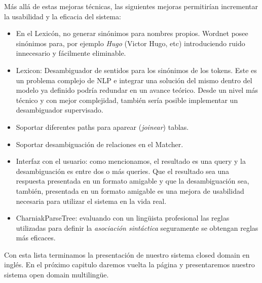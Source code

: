 Más allá de estas mejoras técnicas, las siguientes mejoras permitirían incrementar la usabilidad y la eficacia del sistema:

\begin{itemize}
\item En el Lexicón, no generar sinónimos para nombres propios. Wordnet posee sinónimos para, por ejemplo \textit{Hugo} (Victor Hugo, etc) introduciendo ruido innecesario y fácilmente eliminable.
\item Lexicon: Desambiguador de sentidos para los sinónimos de los tokens. Este es un problema complejo de NLP e integrar una solución del mismo dentro del modelo ya definido podría redundar en un avance teórico. Desde un nivel más técnico y con mejor complejidad, también sería posible implementar un desambiguador supervisado.
\item Soportar diferentes paths para aparear (\textit{joinear}) tablas.
\item Soportar desambiguación de relaciones en el Matcher.
\item Interfaz con el usuario: como mencionamos, el resultado es una query y la desambiguación es entre dos o más queries. Que el resultado sea una respuesta presentada en un formato amigable y que la desambiguación sea, también, presentada en un formato amigable es una mejora de usabilidad necesaria para utilizar el sistema en la vida real.
\item CharniakParseTree: evaluando con un lingüista profesional las reglas utilizadas para definir la \textit{asociación sintáctica} seguramente se obtengan reglas más eficaces.

\end{itemize}

Con esta lista terminamos la presentación de nuestro sistema closed domain en inglés. En el próximo capitulo daremos vuelta la página y presentaremos nuestro sistema open domain multilingüe.